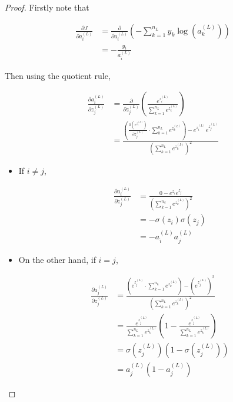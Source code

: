 \documentclass{article}[11pt]
\begin{document}
        
        \begin{proof}
            
            Firstly note that
            
            $$ \begin{aligned}
            \frac{\partial J}{\partial a^{(L)}_i}
            &= \frac{\partial}{\partial a^{(L)}_i} \left( - \sum_{k=1}^{n_L} y_k \log(a^{(L)}_k) \right) \\
            &= - \frac{y_i}{a^{(L)}_i}
            \end{aligned} $$
            
            
            Then using the quotient rule,
            
            $$ \begin{aligned}
            \frac{\partial a^{(L)}_i}{\partial z^{(L)}_j}
            &= \frac{\partial}{\partial z^{(L)}_j} \left( \frac{e^{z^{(L)}_i}}{\sum_{k=1}^{n_L} e^{z^{(L)}_k}} \right) \\
            &= \frac{\left( \frac{\partial \left( e^{z^{(L)}_i}\right)}{\partial z^{(L)}_j} \cdot \sum_{k=1}^{n_L} e^{z^{(L)}_k} \right) - e^{z^{(L)}_i} e^{z^{(L)}_j}}{\left( \sum_{k=1}^{n_L} e^{z^{(L)}_k} \right)^2}
            \end{aligned} $$
            
            \begin{itemize}
            
                \item If $i \neq j$,
            
                $$ \begin{aligned}
                \frac{\partial a^{(L)}_i}{\partial z^{(L)}_j}
                &= \frac{0 - e^{z_i} e^{z_j}}{\left( \sum_{k=1}^{n_L} e^{z^{(L)}_k} \right)^2} \\
                &= - \sigma(z_i) \sigma(z_j) \\
                &= - a^{(L)}_i a^{(L)}_j
                \end{aligned} $$
            
                \item On the other hand, if $i = j$,
            
                $$ \begin{aligned}
                \frac{\partial a^{(L)}_j}{\partial z^{(L)}_j}
                &= \frac{\left( e^{z^{(L)}_j} \cdot \sum_{k=1}^{n_L} e^{z^{(L)}_k} \right) - \left( e^{z^{(L)}_j} \right)^2}{\left( \sum_{k=1}^{n_L} e^{z^{(L)}_k} \right)^2} \\
                &= \frac{e^{z^{(L)}_j}}{\sum_{k=1}^{n_L} e^{z^{(L)}_k}} \left( 1 - \frac{e^{z^{(L)}_j}}{\sum_{k=1}^{n_L} e^{z^{(L)}_k}} \right) \\
                &= \sigma(z^{(L)}_j) \left( 1 - \sigma(z^{(L)}_j) \right) \\
                &= a^{(L)}_j \left( 1 - a^{(L)}_j \right)
                \end{aligned} $$
            

\end{itemize}
\end{proof}
\end{document}
